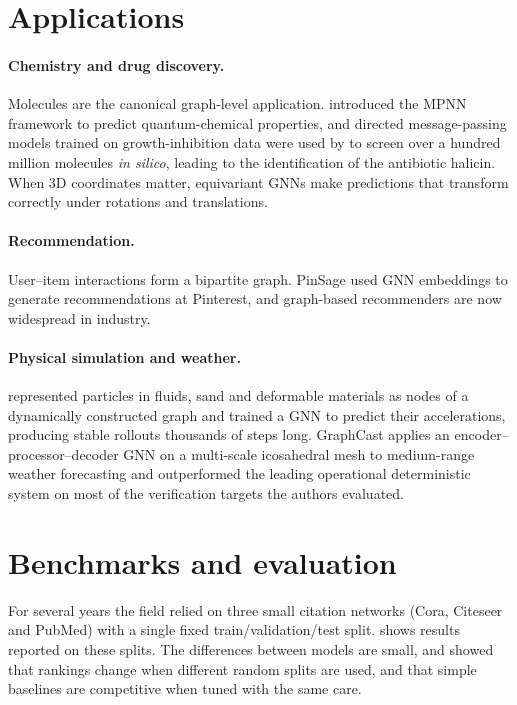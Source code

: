 \documentclass[11pt]{article}
\theoremstyle{plain}
\theoremstyle{definition}
\begin{document}
\section{Applications}
\label{sec:applications}

\paragraph{Chemistry and drug discovery.} Molecules are the canonical graph-level application. \citet{gilmer2017} introduced the MPNN framework to predict quantum-chemical properties, and directed message-passing models trained on growth-inhibition data were used by \citet{stokes2020} to screen over a hundred million molecules \emph{in silico}, leading to the identification of the antibiotic halicin. When 3D coordinates matter, equivariant GNNs \citep{satorras2021} make predictions that transform correctly under rotations and translations.

\paragraph{Recommendation.} User--item interactions form a bipartite graph. PinSage \citep{ying2018} used GNN embeddings to generate recommendations at Pinterest, and graph-based recommenders are now widespread in industry.

\paragraph{Physical simulation and weather.} \citet{sanchez2020} represented particles in fluids, sand and deformable materials as nodes of a dynamically constructed graph and trained a GNN to predict their accelerations, producing stable rollouts thousands of steps long. GraphCast \citep{lam2023} applies an encoder--processor--decoder GNN on a multi-scale icosahedral mesh to medium-range weather forecasting and outperformed the leading operational deterministic system on most of the verification targets the authors evaluated.

\section{Benchmarks and evaluation}
\label{sec:evaluation}

For several years the field relied on three small citation networks (Cora, Citeseer and PubMed) with a single fixed train/validation/test split.  shows results reported on these splits. The differences between models are small, and \citet{shchur2018} showed that rankings change when different random splits are used, and that simple baselines are competitive when tuned with the same care.
\end{document}
